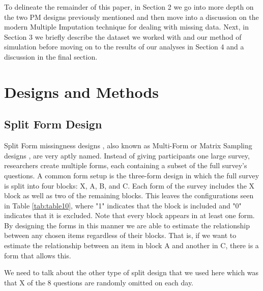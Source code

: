 \documentclass{svjour3}\usepackage[]{graphicx}\usepackage[]{color}
\begin{document}
To delineate the remainder of this paper, in Section 2 we go into more depth on the two PM designs previously mentioned and then move into a discussion on the modern Multiple Imputation technique for dealing with missing data. Next, in Section 3 we briefly describe the dataset we worked with and our method of simulation before moving on to the results of our analyses in Section 4 and a discussion in the final section. \par


\section{Designs and Methods}
\label{sec:1}
\subsection{Split Form Design}
\label{sec:1.1}

Split Form missingness designs \citep{raghunathan1995split}, also  known as Multi-Form \citep{little2013planned} or Matrix Sampling designs \citep{thomas2006evaluation}, are very aptly named. Instead of giving participants one large survey, researchers create multiple forms, each containing a subset of the full survey's questions. A common form setup is the three-form design \citep{graham1996maximizing} in which the full survey is split into four blocks: X, A, B, and C. Each form of the survey includes the X block as well as two of the remaining blocks. This leaves the configurations seen in Table \ref{tab:table10}, where "1" indicates that the block is included and "0" indicates that it is excluded. Note that every block appears in at least one form. By designing the forms in this manner we are able to estimate the relationship between any chosen items regardless of their blocks. That is, if we want to estimate the relationship between an item in block A and another in C, there is a form that allows this. \par

We need to talk about the other type of split design that we used here which was that X of the 8 questions are randomly omitted on each day.  
\end{document}
